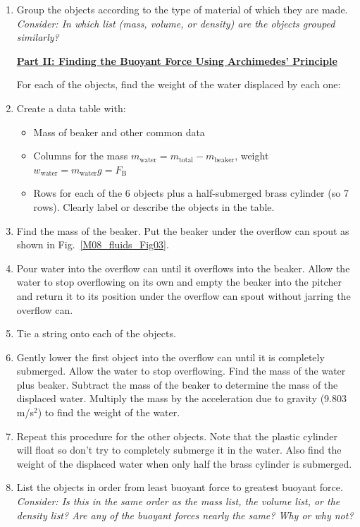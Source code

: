 \begin{enumerate}
\item Group the objects according to the type of material of which they are made. \textit{Consider: In which list (mass, volume, or density) are the objects grouped similarly?}




\underline{\textbf{Part II: Finding the Buoyant Force Using Archimedes' Principle}}

For each of the objects, find the weight of the water displaced by each one:

\item Create a data table with:
\begin{itemize}
    \item Mass of beaker and other common data
    \item Columns for the mass $m_\text{water} = m_\text{total} - m_\text{beaker}$, weight $w_\text{water} = m_\text{water} g = F_\text{B}$
    \item Rows for each of the 6 objects plus a half-submerged brass cylinder (so 7 rows). Clearly label or describe the objects in the table.
\end{itemize} 
\item Find the mass of the beaker. Put the beaker under the overflow can spout as shown in Fig.~\ref{M08_fluids_Fig03}.
\item Pour water into the overflow can until it overflows into the beaker. Allow the water to stop overflowing on its own and empty the beaker into the pitcher and return it to its position under the overflow can spout without jarring the overflow can.
\item Tie a string onto each of the objects.
\item Gently lower the first object into the overflow can until it is completely submerged. Allow the water to stop overflowing. Find the mass of the water plus beaker. Subtract the mass of the beaker to determine the mass of the displaced water. Multiply the mass by the acceleration due to gravity (9.803 m/s$^2$) to find the weight of the water.
\item Repeat this procedure for the other objects. Note that the plastic cylinder will float so don’t try to completely submerge it in the water. Also find the weight of the displaced water when only half the brass cylinder is submerged.
\item List the objects in order from least buoyant force to greatest buoyant force. \textit{Consider: Is this in the same order as the mass list, the volume list, or the density list? Are any of the buoyant forces nearly the same? Why or why not?}



\end{enumerate}
